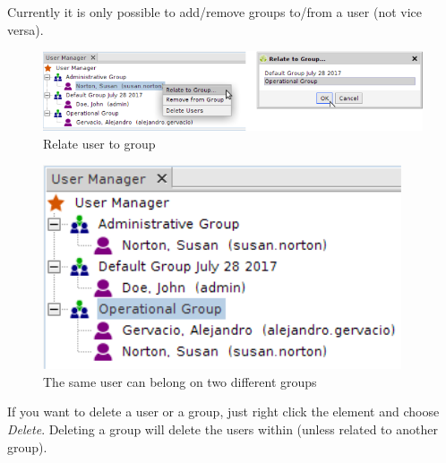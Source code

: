 \documentclass[a4paper]{article}
\begin{document}
		Currently it is only possible to add/remove groups to/from a user (not vice versa).\\
		\begin{figure}[h!]
			\centering
			\includegraphics[width=0.5\linewidth]{img/user_manager_relate_to_group.png}
			\caption{Relate user to group}
			\label{fig:user_manager_relate_to_group}
		\end{figure}
		
		\begin{figure}[h!]
			\centering
			\includegraphics[width=0.4\linewidth]{img/user_manager_user_and_groups.png}
			\caption{The same user can belong on two different groups}
			\label{fig:user_manager_user_and_groups}
		\end{figure}
		
		If you want to delete a user or a group, just right click the element and choose \textit{Delete}. Deleting a group will delete the users within (unless related to another group).
		
		\clearpage
\end{document}
